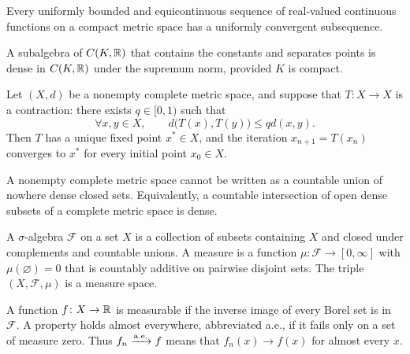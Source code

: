     \begin{theorem}
        Every uniformly bounded and equicontinuous sequence of real-valued
        continuous functions on a compact metric space has a uniformly
        convergent subsequence.
    \end{theorem}

    \begin{theorem}
        A subalgebra of $C(K,\mathbb{R})$ that contains the constants and separates
        points is dense in $C(K,\mathbb{R})$ under the supremum norm, provided $K$ is
        compact.
    \end{theorem}

    \begin{theorem}
        Let $(X,d)$ be a nonempty complete metric space, and suppose that
        $T\colon X\to X$ is a contraction: there exists $q\in[0,1)$ such that
        \[
            \forall x,y\in X,
            \qquad
            d\bigl(T(x),T(y)\bigr)\leq qd(x,y).
        \]
        Then $T$ has a unique fixed point $x^\ast\in X$, and the iteration
        $x_{n+1}=T(x_n)$ converges to $x^\ast$ for every initial point $x_0\in X$.
    \end{theorem}

    \begin{theorem}
        A nonempty complete metric space cannot be written as a countable union
        of nowhere dense closed sets. Equivalently, a countable intersection of
        open dense subsets of a complete metric space is dense.
    \end{theorem}

    \begin{definition}
        A $\sigma$-algebra $\mathcal{F}$ on a set $X$ is a collection of subsets
        containing $X$ and closed under complements and countable unions. A
        measure is a function $\mu\colon \mathcal{F}\to[0,\infty]$ with
        $\mu(\varnothing)=0$ that is countably additive on pairwise disjoint
        sets. The triple $(X,\mathcal{F},\mu)$ is a measure space.

        A function $f\colon X\to\mathbb{R}$ is measurable if the inverse image of every Borel
        set is in $\mathcal{F}$. A property holds almost everywhere, abbreviated
        a.e., if it fails only on a set of measure zero. Thus $f_n\xrightarrow{\mathrm{a.e.}} f$ means
        that $f_n(x)\to f(x)$ for almost every $x$.
    \end{definition}

